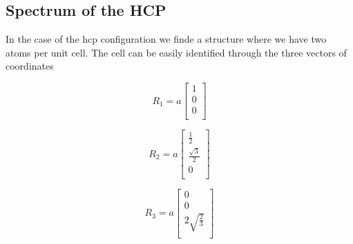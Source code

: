 \documentclass[a4paper]{article}
\begin{document}
\subsection{Spectrum of the HCP}

In the case of the hcp configuration we finde a structure where we have two atoms per unit cell.
The cell can be easily identified through the three vectors of coordinates\\
\begin{minipage}{0.3\textwidth}
\centering
\begin{equation*}
R_1 = a
\begin{bmatrix}
	1 \\
    0 \\
    0 \\
    
\end{bmatrix}
\end{equation*}

\end{minipage}
\begin{minipage}{0.3\textwidth}
\centering
\begin{equation*}
R_2 = a
\begin{bmatrix}
    \frac{1}{2} \\
    \frac{\sqrt{3}}{2}  \\
    0 \\
\end{bmatrix}
\end{equation*}
\end{minipage}
\begin{minipage}{0.3\textwidth}
\centering
\begin{equation*}
R_3 = a
\begin{bmatrix}
    0 \\
    0 \\
    2\sqrt{\frac{2}{3}} \\
\end{bmatrix}
\end{equation*}
\end{minipage}
\end{document}
